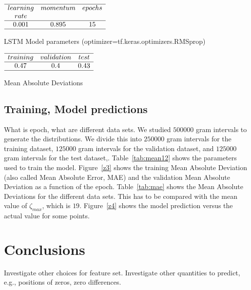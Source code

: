 \documentclass[twoside]{article}
\begin{document}
\begin{table}
\centering \(\begin{array}{cccccccccccc}

\hline
learning     &momentum  &epochs  \\
rate    &  &  \\
\hline
0.001 &0.895  & 15  \\
\hline
\end{array}\)
\caption{LSTM Model parameters (optimizer=tf.keras.optimizers.RMSprop)}
\label{tab:mean12}
\end{table}

\begin{table}
\centering \(\begin{array}{cccccccccccc}

\hline
training     &validation  &test \\
\hline
0.47 &0.4  & 0.43  \\
\hline
\end{array}\)
\caption{Mean Absolute Deviations}
\label{tab:mae}
\end{table}

\subsection{\label{relation}Training,  Model predictions}

What is epoch, what are different data sets.
We studied $500000$ gram intervals  to generate the distributions.
We divide this into $250000$ gram intervals for the training dataset, 
$125000$ gram intervals for the validation dataset, 
and $125000$ gram intervals for the test dataset,.
Table~\ref{tab:mean12} shows the parameters used to train the model. 
Figure~\ref{z3} shows the training Mean Absolute Deviation (also called Mean Absolute Error, MAE) 
and the validation Mean Absolute Deviation as a function of the epoch.
Table~\ref{tab:mae} shows the Mean Absolute Deviations for the different data sets.  This has
to be compared with the mean value of $\zeta_{max}$, which is $19$.  Figure~\ref{z4}
shows the model prediction versus the actual value for some points.

\section{\label{conclusions}Conclusions}

Investigate other choices for feature set. Investigate other quantities to predict, e.g., positions of 
zeros, zero differences.
\end{document}
